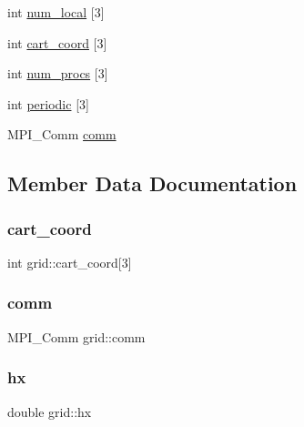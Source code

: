 \begin{DoxyCompactItemize}
\item 
int \mbox{\hyperlink{structgrid_acf89afe575bbed051668792c05734ca8}{num\+\_\+local}} \mbox{[}3\mbox{]}
\item 
int \mbox{\hyperlink{structgrid_ad50e4be759de9347a95dfee230513a7f}{cart\+\_\+coord}} \mbox{[}3\mbox{]}
\item 
int \mbox{\hyperlink{structgrid_a3423f9f7decc517f8f878dfd9322e584}{num\+\_\+procs}} \mbox{[}3\mbox{]}
\item 
int \mbox{\hyperlink{structgrid_a6e996f221c8ae77ccde468967a0100b9}{periodic}} \mbox{[}3\mbox{]}
\item 
M\+P\+I\+\_\+\+Comm \mbox{\hyperlink{structgrid_a73e13cf8311ea21660def4de1fa35197}{comm}}
\end{DoxyCompactItemize}


\subsection{Member Data Documentation}
\mbox{\label{structgrid_ad50e4be759de9347a95dfee230513a7f}} 
\subsubsection{\texorpdfstring{cart\+\_\+coord}{cart\_coord}}
{\footnotesize\ttfamily int grid\+::cart\+\_\+coord\mbox{[}3\mbox{]}}

\mbox{\label{structgrid_a73e13cf8311ea21660def4de1fa35197}} 
\subsubsection{\texorpdfstring{comm}{comm}}
{\footnotesize\ttfamily M\+P\+I\+\_\+\+Comm grid\+::comm}

\mbox{\label{structgrid_a91688427f3973ec33bfbade6d9f4ca1f}} 
\subsubsection{\texorpdfstring{hx}{hx}}
{\footnotesize\ttfamily double grid\+::hx}

\mbox{\label{structgrid_ae2a0981134a14954c5d1401af51d25e0}} 
